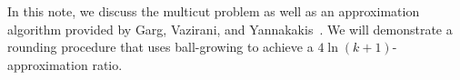 In this note, we discuss the multicut problem as well as an approximation algorithm provided by Garg, Vazirani, and Yannakakis~\cite{GVY96}. We will demonstrate a rounding procedure that uses ball-growing to achieve a $4\ln(k+1)$-approximation ratio.
